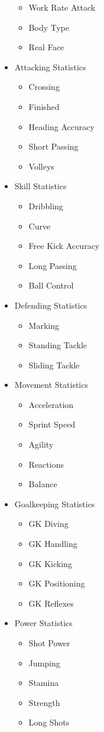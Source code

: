 \begin{multicols}{3}
\begin{itemize}
\begin{itemize}
\item	Work Rate Attack 
\item	Body Type 
\item	Real Face 
\end{itemize}
\item	Attacking Statistics
\begin{itemize}
\item	Crossing
\item	Finished
\item	Heading Accuracy
\item	Short Passing
\item	Volleys
\end{itemize}
\columnbreak
\item	Skill Statistics
\begin{itemize}
\item	Dribbling
\item	Curve
\item	Free Kick Accuracy
\item	Long Passing
\item	Ball Control
\end{itemize}
\item	Defending Statistics
\begin{itemize}
\item	Marking
\item	Standing Tackle
\item	Sliding Tackle
\end{itemize}
\item	Movement Statistics
\begin{itemize}
\item	Acceleration
\item	Sprint Speed
\item	Agility
\item	Reactions
\item	Balance
\end{itemize}
\item	Goalkeeping Statistics
\begin{itemize}
\item	GK Diving
\item	GK Handling
\item	GK Kicking
\item	GK Positioning
\item	GK Reflexes
\end{itemize}
\item	Power Statistics
\begin{itemize}
\item	Shot Power
\item	Jumping
\item	Stamina
\item	Strength
\item	Long Shots
\end{itemize}
\end{itemize}
\end{multicols}

